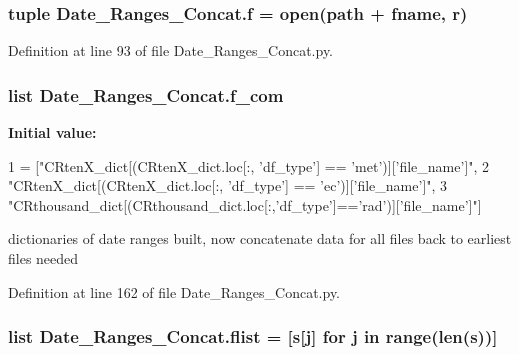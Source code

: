 \hypertarget{namespace_date___ranges___concat_a21362afa3c3692b51bae83ce0459dcd7}{}
\subsubsection[{f}]{\setlength{\rightskip}{0pt plus 5cm}tuple Date\+\_\+\+Ranges\+\_\+\+Concat.\+f = open({\bf path} + {\bf fname}, \textquotesingle{}r\textquotesingle{})}\label{namespace_date___ranges___concat_a21362afa3c3692b51bae83ce0459dcd7}


Definition at line 93 of file Date\+\_\+\+Ranges\+\_\+\+Concat.\+py.

\hypertarget{namespace_date___ranges___concat_afc781be6ba4a2beb6b49dc302a1efd30}{}
\subsubsection[{f\+\_\+com}]{\setlength{\rightskip}{0pt plus 5cm}list Date\+\_\+\+Ranges\+\_\+\+Concat.\+f\+\_\+com}\label{namespace_date___ranges___concat_afc781be6ba4a2beb6b49dc302a1efd30}
{\bfseries Initial value\+:}
\begin{DoxyCode}
1 = [\textcolor{stringliteral}{"CRtenX\_dict[(CRtenX\_dict.loc[:, 'df\_type'] == 'met')]['file\_name']"},
2          \textcolor{stringliteral}{"CRtenX\_dict[(CRtenX\_dict.loc[:, 'df\_type'] == 'ec')]['file\_name']"},
3          \textcolor{stringliteral}{"CRthousand\_dict[(CRthousand\_dict.loc[:,'df\_type']=='rad')]['file\_name']"}]
\end{DoxyCode}


dictionaries of date ranges built, now concatenate data for all files back to earliest files needed 



Definition at line 162 of file Date\+\_\+\+Ranges\+\_\+\+Concat.\+py.

\hypertarget{namespace_date___ranges___concat_ac0724de24e84d20872e1d08a28a73fac}{}
\subsubsection[{flist}]{\setlength{\rightskip}{0pt plus 5cm}list Date\+\_\+\+Ranges\+\_\+\+Concat.\+flist = \mbox{[}{\bf s}\mbox{[}j\mbox{]} for j in range(len({\bf s}))\mbox{]}}\label{namespace_date___ranges___concat_ac0724de24e84d20872e1d08a28a73fac}


